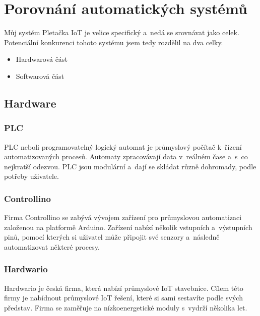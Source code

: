 \chapter{Porovnání automatických systémů}
Můj systém Pletačka IoT je velice specifický a~nedá se srovnávat jako celek. 
Potenciální konkurenci tohoto systému jsem tedy rozdělil na dva celky.

\begin{itemize} %
    \item Hardwarová část
    \item Softwarová část
\end{itemize}



\section{Hardware}

\subsection{PLC}
PLC neboli programovatelný logický automat je průmyslový počítač k~řízení automatizovaných procesů.
Automaty zpracovávají data v~reálném čase a~s~co nejkratší odezvou.
PLC jsou modulární a~dají se skládat různě dohromady, podle potřeby uživatele.



\subsection{Controllino}
Firma Controllino\cite{CONTROLLINO} se zabývá vývojem zařízení pro průmyslovou automatizaci založenou na platformě Arduino.
Zařízení nabízí několik vstupních a~výstupních pinů, pomocí kterých si uživatel může připojit své senzory a~následně automatizovat některé procesy. 




\subsection{Hardwario}
Hardwario \cite{HARDWARIO} je česká firma, která nabízí průmyslové IoT stavebnice.
Cílem této firmy je nabídnout průmyslové IoT řešení, které si sami sestavíte podle svých představ.
Firma se zaměřuje na nízkoenergetické moduly s~vydrží několika let.



